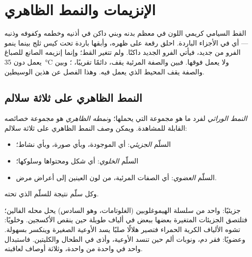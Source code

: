 \chapter{الإنزيمات والنمط الظاهري}\label{ch:g11:enzymes-and-phenotype}

القط السيامي كريمي اللون في معظم بدنه وبني داكن في أذنيه وخطمه وكفوفه
وذنبه --- أي في الأجزاء الباردة. احلق رقعة على ظهره، وأبقها باردة تحت
كيس ثلج بينما ينمو الفرو من جديد، فيأتي الفرو الجديد داكنًا. ولم تتغير
 القط؛ وإنما إنزيمه الصانع للصباغ يعمل دون \qty{35}{\celsius}
ولا يعمل فوقها. فبين  والصفة المرئية يقف، دائمًا تقريبًا،
؛ وبين  والصفة يقف المحيط الذي يعمل فيه. وهذا الفصل عن
هذين الوسيطين.

\section{النمط الظاهري على ثلاثة سلالم}

\begin{definition}\label{def:g11:enzymes-and-phenotype:phenotype}
\emph{النمط الوراثي} لفرد ما هو مجموعة  التي
يحملها؛ و\emph{نمطه الظاهري} هو مجموعة خصائصه القابلة
للمشاهدة. ويمكن وصف النمط الظاهري على ثلاثة سلالم:
\begin{itemize}
  \item السلّم \emph{الجزيئي}: أي  الموجودة، وبأي صورة،
        وبأي نشاط؛
  \item السلّم \emph{الخلوي}: أي شكل  ومحتواها وسلوكها؛
  \item السلّم \emph{العضوي}: أي الصفات المرئية، من لون العينين إلى
        أعراض مرض.
\end{itemize}
وكل سلّم نتيجة للسلّم الذي تحته.
\end{definition}

\begin{example}\label{ex:g11:enzymes-and-phenotype:sickle}
جزيئيًا:  واحد من سلسلة الهيموغلوبين (الغلوتامات، وهو
السادس) يحل محله الفالين؛ فتلتصق الجزيئات المتغيرة بعضها ببعض في
ألياف طويلة حين ينقص الأكسجين. وخلويًا: تشوه الألياف الكرية الحمراء
فتصير هلالًا صلبًا يسد الأوعية الصغيرة وينكسر بسهولة. وعضويًا: فقر دم،
ونوبات ألم حين تنسد الأوعية، وأذى في الطحال والكليتين. فاستبدال واحد
في  واحدة من  واحدة، وثلاثة أوصاف لعاقبته.
\end{example}

